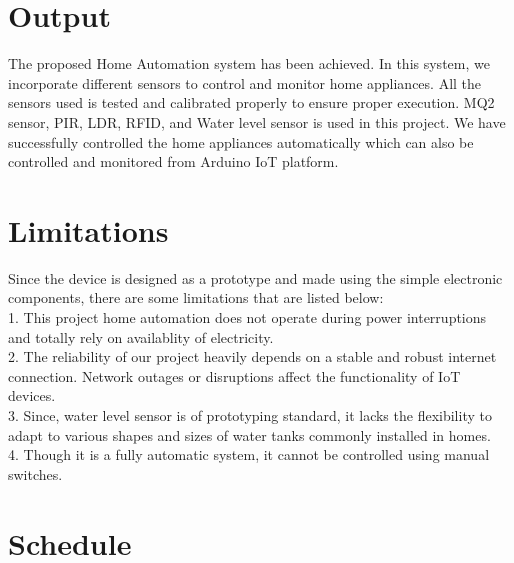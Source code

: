 \documentclass[12pt,a4paper]{report}
\begin{document}
	\section{Output}
	\begin{justify}

	The proposed Home Automation system has been achieved. In this system, we incorporate different sensors to control and monitor home appliances. All the sensors used is tested and calibrated properly to ensure proper execution.  MQ2 sensor, PIR, LDR, RFID, and Water level sensor is used in this project. We have successfully controlled the home appliances automatically which can also be controlled and monitored from Arduino IoT platform. 
	\end{justify}
	\section{Limitations}
	\begin{justify}
		

	Since the device is designed as a prototype and made using the simple electronic components, there are some limitations that are listed below:\\
	1. This project home automation does not operate during power interruptions and totally rely on availablity of electricity.\\
	2.  The reliability of our project heavily depends on a stable and robust internet connection. Network outages or disruptions affect the functionality of IoT devices.\\
	3. Since,  water level sensor is  of prototyping standard, it lacks the flexibility to adapt to various shapes and sizes of water tanks commonly installed in homes.\\
	4. Though it is a fully automatic system, it cannot be controlled using manual switches. \\
	
			\end{justify}
	\section{Schedule}
	

		
		
			
			
\end{document}
